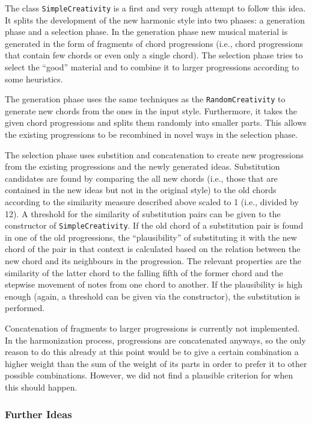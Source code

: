 The class \texttt{SimpleCreativity} is a first and very rough attempt to follow this idea.
It splits the development of the new harmonic style into two phases: a generation phase and a selection phase.
In the generation phase new musical material is generated in the form of fragments of chord progressions (i.e., chord progressions that contain few chords or even only a single chord).
The selection phase tries to select the ``good'' material and to combine it to larger progressions according to some heuristics.

The generation phase uses the same techniques as the \texttt{RandomCreativity} to generate new chords from the ones in the input style.
Furthermore, it takes the given chord progressions and splits them randomly into smaller parts.
This allows the existing progressions to be recombined in novel ways in the selection phase.

The selection phase uses substition and concatenation to create new progressions from the existing progressions and the newly generated ideas.
Substitution candidates are found by comparing the all new chords (i.e., those that are contained in the new ideas but not in the original style) to the old chords according to the similarity measure described above scaled to 1 (i.e., divided by 12).
A threshold for the similarity of substitution pairs can be given to the constructor of \texttt{SimpleCreativity}.
If the old chord of a substitution pair is found in one of the old progressions, the ``plausibility'' of substituting it with the new chord of the pair in that context is calculated based on the relation between the new chord and its neighbours in the progression.
The relevant properties are the similarity of the latter chord to the falling fifth of the former chord and the stepwise movement of notes from one chord to another.
If the plausibility is high enough (again, a threshold can be given via the constructor), the substitution is performed.

Concatenation of fragments to larger progressions is currently not implemented.
In the harmonization process, progressions are concatenated anyways, so the only reason to do this already at this point would be to give a certain combination a higher weight than the sum of the weight of its parts in order to prefer it to other possible combinations.
However, we did not find a plausible criterion for when this should happen.

\subsubsection{Further Ideas}

